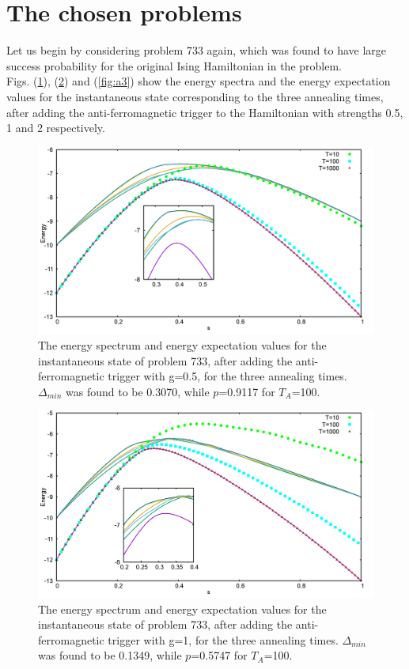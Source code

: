 \documentclass[../main.tex]{subfiles}
\begin{document}
\section*{The chosen problems}
Let us begin by considering problem 733 again, which was found to have large success probability for the original Ising Hamiltonian in the problem. \\
Figs. (\ref{fig:a1}), (\ref{fig:a2}) and (\ref{fig:a3}) show the energy spectra and the energy expectation values for the instantaneous state corresponding to the three annealing times, after adding the anti-ferromagnetic trigger to the Hamiltonian with strengths 0.5, 1 and 2 respectively.
\begin{figure}[H]
\centering 
\includegraphics[scale=0.24]{733_s12_A_g0.png}
\caption{The energy spectrum and energy expectation values for the instantaneous state of problem 733, after adding the anti-ferromagnetic trigger with g=0.5, for the three annealing times. $\Delta_{min}$ was found to be 0.3070, while $p$=0.9117 for $T_A$=100. }
\label{fig:a1}
\end{figure}
\begin{figure}[H]
\centering 
\includegraphics[scale=0.24]{733_s12_A_g1.png}
\caption{The energy spectrum and energy expectation values for the instantaneous state of problem 733, after adding the anti-ferromagnetic trigger with g=1, for the three annealing times. $\Delta_{min}$ was found to be 0.1349, while $p$=0.5747 for $T_A$=100. }
\label{fig:a2}
\end{figure}
\end{document}
